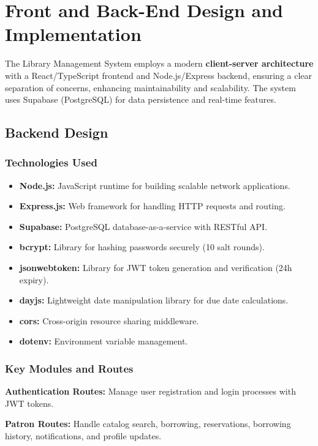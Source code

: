 \documentclass[11pt,a4paper]{article}
\begin{document}
\section{Front and Back-End Design and Implementation}

The Library Management System employs a modern \textbf{client-server architecture} with a React/TypeScript frontend and Node.js/Express backend, ensuring a clear separation of concerns, enhancing maintainability and scalability. The system uses Supabase (PostgreSQL) for data persistence and real-time features.

\subsection{Backend Design}

\subsubsection{Technologies Used}

\begin{itemize}
    \item \textbf{Node.js:} JavaScript runtime for building scalable network applications.
    \item \textbf{Express.js:} Web framework for handling HTTP requests and routing.
    \item \textbf{Supabase:} PostgreSQL database-as-a-service with RESTful API.
    \item \textbf{bcrypt:} Library for hashing passwords securely (10 salt rounds).
    \item \textbf{jsonwebtoken:} Library for JWT token generation and verification (24h expiry).
    \item \textbf{dayjs:} Lightweight date manipulation library for due date calculations.
    \item \textbf{cors:} Cross-origin resource sharing middleware.
    \item \textbf{dotenv:} Environment variable management.
\end{itemize}

\subsubsection{Key Modules and Routes}

\textbf{Authentication Routes:} Manage user registration and login processes with JWT tokens.

\textbf{Patron Routes:} Handle catalog search, borrowing, reservations, borrowing history, notifications, and profile updates.
\end{document}
